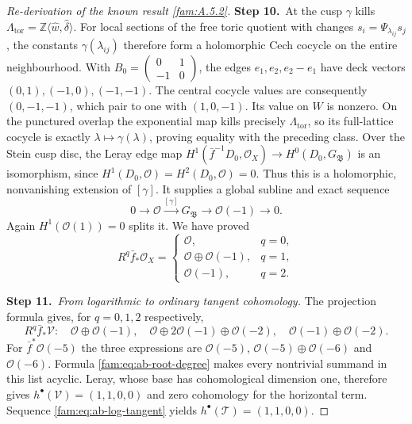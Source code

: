 \begin{proof}[Re-derivation of the known result \ref{fam:A.5.2}]
\par\smallskip\noindent\textbf{Step 10.}\ At the cusp $\gamma$ kills
$\Lambda_{\mathrm{tor}}=\mathbb Z\langle\widehat w,\widehat\delta\rangle$.
For local sections of the free toric quotient with changes
$s_i=\Psi_{\lambda_{ij}}s_j$, the constants
$\gamma(\lambda_{ij})$ therefore form a holomorphic Cech cocycle
on the entire neighbourhood. With
$B_0=\left(\begin{smallmatrix}0&1\\-1&0\end{smallmatrix}\right)$,
the edges $e_1,e_2,e_2-e_1$ have deck vectors
$(0,1),(-1,0),(-1,-1)$. The central cocycle values are consequently
$(0,-1,-1)$, which pair to one with $(1,0,-1)$.
Its value on $W$ is nonzero. On the punctured overlap the exponential
map kills precisely $\Lambda_{\mathrm{tor}}$, so its full-lattice
cocycle is exactly $\lambda\mapsto\gamma(\lambda)$, proving equality
with the preceding class. Over the Stein cusp disc, the Leray edge
map $H^1(\bar f^{-1}D_0,\mathcal O_X)\to H^0(D_0,G_{\mathfrak B})$ is an
isomorphism, since $H^1(D_0,\mathcal O)=H^2(D_0,\mathcal O)=0$.
Thus this is a holomorphic, nonvanishing extension of $[\gamma]$.
It supplies a global subline and exact sequence
\[
 0\longrightarrow\mathcal O\xrightarrow{[\gamma]}G_{\mathfrak B}
 \longrightarrow\mathcal O(-1)\longrightarrow0.
\]
Again $H^1(\mathcal O(1))=0$ splits it. We have proved
\begin{equation}\label{fam:eq:ab-direct-images}
 R^q\bar f_*\mathcal O_X=
 \begin{cases}
 \mathcal O,&q=0,\\
 \mathcal O\oplus\mathcal O(-1),&q=1,\\
 \mathcal O(-1),&q=2.
 \end{cases}
\end{equation}

\par\smallskip\noindent\textbf{Step 11.}\ \emph{From logarithmic to ordinary tangent cohomology.}
The projection formula gives, for $q=0,1,2$ respectively,
\[
 R^q\bar f_*\mathcal V:
 \quad\mathcal O\oplus\mathcal O(-1),\quad
 \mathcal O\oplus2\mathcal O(-1)\oplus\mathcal O(-2),\quad
 \mathcal O(-1)\oplus\mathcal O(-2).
\]
For $\bar f^*\mathcal O(-5)$ the three expressions are
$\mathcal O(-5)$, $\mathcal O(-5)\oplus\mathcal O(-6)$ and
$\mathcal O(-6)$. Formula \eqref{fam:eq:ab-root-degree} makes every
nontrivial summand in this list acyclic. Leray, whose base has
cohomological dimension one, therefore gives
$h^\bullet(\mathcal V)=(1,1,0,0)$ and zero cohomology for the
horizontal term. Sequence \eqref{fam:eq:ab-log-tangent} yields
$h^\bullet(\mathcal T)=(1,1,0,0)$.


\end{proof}
